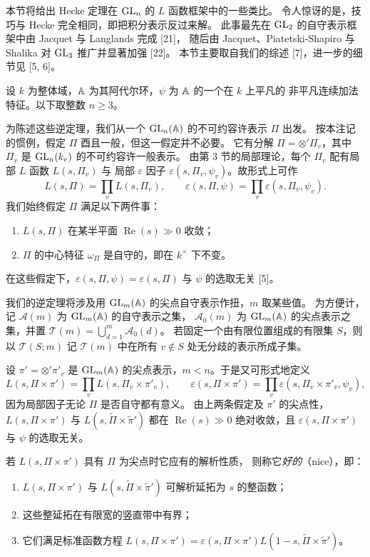 本节将给出 Hecke 定理在 $\mathrm{GL}_n$ 的 $L$ 函数框架中的一些类比。
令人惊讶的是，技巧与 Hecke 完全相同，即把积分表示反过来解。
此事最先在 $\mathrm{GL}_2$ 的自守表示框架中由 Jacquet 与 Langlands 完成 [21]，
随后由 Jacquet、Piatetski-Shapiro 与 Shalika 对 $\mathrm{GL}_3$ 推广并显著加强 [22]。
本节主要取自我们的综述 [7]，进一步的细节见 [5, 6]。

设 $k$ 为整体域，$\mathbb{A}$ 为其阿代尔环，$\psi$ 为 $\mathbb{A}$ 的一个在 $k$ 上平凡的
非平凡连续加法特征。以下取整数 $n\ge3$。

为陈述这些逆定理，我们从一个 $\mathrm{GL}_n(\mathbb{A})$ 的不可约容许表示 $\Pi$ 出发。
按本注记的惯例，假定 $\Pi$ 酉且一般，但这一假定并不必要。
它有分解 $\Pi=\otimes'\Pi_v$，其中 $\Pi_v$ 是 $\mathrm{GL}_n(k_v)$ 的不可约容许一般表示。
由第 3 节的局部理论，每个 $\Pi_v$ 配有局部 $L$ 函数 $L(s,\Pi_v)$ 与
局部 $\varepsilon$ 因子 $\varepsilon(s,\Pi_v,\psi_v)$。故形式上可作
\[
L(s,\Pi)=\prod_vL(s,\Pi_v),
\qquad
\varepsilon(s,\Pi,\psi)=\prod_v\varepsilon(s,\Pi_v,\psi_v).
\]
我们始终假定 $\Pi$ 满足以下两件事：
\begin{enumerate}
\item $L(s,\Pi)$ 在某半平面 $\operatorname{Re}(s)\gg0$ 收敛；
\item $\Pi$ 的中心特征 $\omega_\Pi$ 是自守的，即在 $k^\times$ 下不变。
\end{enumerate}
在这些假定下，$\varepsilon(s,\Pi,\psi)=\varepsilon(s,\Pi)$ 与 $\psi$ 的选取无关 [5]。

我们的逆定理将涉及用 $\mathrm{GL}_m(\mathbb{A})$ 的尖点自守表示作扭，$m$ 取某些值。
为方便计，记 $\mathcal{A}(m)$ 为 $\mathrm{GL}_m(\mathbb{A})$ 的自守表示之集，
$\mathcal{A}_0(m)$ 为 $\mathrm{GL}_m(\mathbb{A})$ 的尖点表示之集，并置
$\mathcal{T}(m)=\bigcup_{d=1}^m\mathcal{A}_0(d)$。
若固定一个由有限位置组成的有限集 $S$，则以 $\mathcal{T}(S;m)$ 记
$\mathcal{T}(m)$ 中在所有 $v\notin S$ 处无分歧的表示所成子集。

设 $\pi'=\otimes'\pi'_v$ 是 $\mathrm{GL}_m(\mathbb{A})$ 的尖点表示，$m<n$。于是又可形式地定义
\[
L(s,\Pi\times\pi')=\prod_vL(s,\Pi_v\times\pi'_v),
\qquad
\varepsilon(s,\Pi\times\pi')=\prod_v\varepsilon(s,\Pi_v\times\pi'_v,\psi_v),
\]
因为局部因子无论 $\Pi$ 是否自守都有意义。
由上两条假定及 $\pi'$ 的尖点性，$L(s,\Pi\times\pi')$ 与
$L(s,\widetilde{\Pi}\times\widetilde{\pi}')$ 都在 $\operatorname{Re}(s)\gg0$
绝对收敛，且 $\varepsilon(s,\Pi\times\pi')$ 与 $\psi$ 的选取无关。

若 $L(s,\Pi\times\pi')$ 具有 $\Pi$ 为尖点时它应有的解析性质，
则称它\emph{好的}（nice），即：
\begin{enumerate}
\item $L(s,\Pi\times\pi')$ 与 $L(s,\widetilde{\Pi}\times\widetilde{\pi}')$
可解析延拓为 $s$ 的整函数；
\item 这些整延拓在有限宽的竖直带中有界；
\item 它们满足标准函数方程
$L(s,\Pi\times\pi')=\varepsilon(s,\Pi\times\pi')L(1-s,\widetilde{\Pi}\times\widetilde{\pi}')$。
\end{enumerate}

